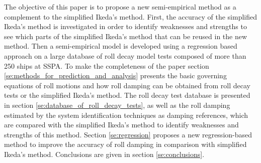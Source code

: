 The objective of this paper is to propose a new semi-empirical method as a complement to the simplified Ikeda's method. First, the accuracy of the simplified Ikeda's method is investigated in order to identify weaknesses and strengths to see which parts of the simplified Ikeda's method that can be reused in the new method.  
Then a semi-empirical model is developed using a regression based approach on a large database of roll decay model tests composed of more than 250 ships at SSPA.
To make the completeness of the paper section \ref{se:methods_for_prediction_and_analysis} presents the basic governing equations of roll motions and how roll damping can be obtained from roll decay tests or the simplified Ikeda's method. 
The roll decay test database is presented in section \ref{se:database_of_roll_decay_tests}, as well as the roll damping estimated by the system identification techniques as damping references, which are compared with the simplified Ikeda's method to identify weaknesses and strengths of this method. Section \ref{se:regression} proposes a new regression-based method to improve the accuracy of roll damping in comparison with simplified Ikeda's method. Conclusions are given in section \ref{se:conclusions}.  
